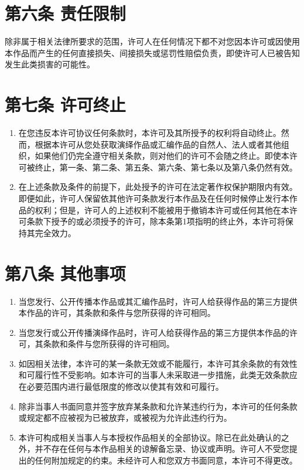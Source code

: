 \documentclass{book}
\begin{document}
\section{第六条 责任限制}
除非属于相关法律所要求的范围，许可人在任何情况下都不对您因本许可或因使用本作品而产生的任何直接损失、间接损失或惩罚性赔偿负责，即使许可人已被告知发生此类损害的可能性。 
\section{第七条 许可终止}
\begin{enumerate}
	\item 在您违反本许可协议任何条款时，本许可及其所授予的权利将自动终止。然而，根据本许可从您处获取演绎作品或汇编作品的自然人、法人或者其他组织，如果他们仍完全遵守相关条款，则对他们的许可不会随之终止。即使本许可被终止，第一条、第二条、第五条、第六条、第七条以及第八条仍然有效。
	\item 在上述条款及条件的前提下，此处授予的许可在法定著作权保护期限内有效。即便如此，许可人保留依其他许可条款发行本作品及在任何时候停止发行本作品的权利；但是，许可人的上述权利不能被用于撤销本许可或任何其他在本许可条款下授予的或必须授予的许可，除本条第1项指明的终止外，本许可将保持其完全效力。
\end{enumerate}
\section{第八条 其他事项}
\begin{enumerate}
	\item 当您发行、公开传播本作品或其汇编作品时，许可人给获得作品的第三方提供本作品的许可，其条款和条件与您所获得的许可相同。
	\item 当您发行或公开传播演绎作品时，许可人给获得作品的第三方提供本作品的许可，其条款和条件与您所获得的许可相同。
	\item 如因相关法律，本许可的某一条款无效或不能履行，本许可其余条款的有效性和可履行性不受影响。如本许可的当事人未采取进一步措施，此类无效条款应在必要范围内进行最低限度的修改以使其有效和可履行。
	\item 除非当事人书面同意并签字放弃某条款和允许某违约行为，本许可的任何条款或规定都不应被视为已被放弃，或被视为允许此违约行为。
	\item 本许可构成相关当事人与本授权作品相关的全部协议。除已在此处确认的之外，并不存在任何与本作品相关的谅解备忘录、协议或声明。许可人不受您提出的任何附加规定的约束。未经许可人和您双方书面同意，本许可不得更改。
\end{enumerate}
\end{document}
